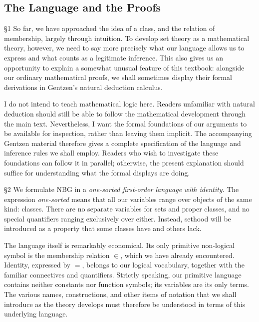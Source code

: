 
\subsection{The Language and the Proofs}

§1 \quad So far, we have approached the idea of a class, and the relation of membership, largely through intuition. To develop set theory as a mathematical theory, however, we need to say more precisely what our language allows us to express and what counts as a legitimate inference. This also gives us an opportunity to explain a somewhat unusual feature of this textbook: alongside our ordinary mathematical proofs, we shall sometimes display their formal derivations in Gentzen's natural deduction calculus.

I do not intend to teach mathematical logic here. Readers unfamiliar with natural deduction should still be able to follow the mathematical development through the main text. Nevertheless, I want the formal foundations of our arguments to be available for inspection, rather than leaving them implicit. The accompanying Gentzen material therefore gives a complete specification of the language and inference rules we shall employ. Readers who wish to investigate these foundations can follow it in parallel; otherwise, the present explanation should suffice for understanding what the formal displays are doing.

§2 \quad We formulate NBG in a \textit{one-sorted first-order language with identity}. The expression \textit{one-sorted} means that all our variables range over objects of the same kind: classes. There are no separate variables for sets and proper classes, and no special quantifiers ranging exclusively over either. Instead, sethood will be introduced as a property that some classes have and others lack.

The language itself is remarkably economical. Its only primitive non-logical symbol is the membership relation $\in$, which we have already encountered. Identity, expressed by $=$, belongs to our logical vocabulary, together with the familiar connectives and quantifiers. Strictly speaking, our primitive language contains neither constants nor function symbols; its variables are its only terms. The various names, constructions, and other items of notation that we shall introduce as the theory develops must therefore be understood in terms of this underlying language.

\begin{formalderivation}

\end{formalderivation}

